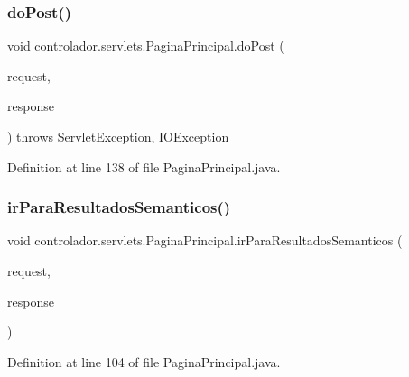 \subsubsection{\texorpdfstring{do\+Post()}{doPost()}}
{\footnotesize\ttfamily void controlador.\+servlets.\+Pagina\+Principal.\+do\+Post (\begin{DoxyParamCaption}\item[{Http\+Servlet\+Request}]{request,  }\item[{Http\+Servlet\+Response}]{response }\end{DoxyParamCaption}) throws Servlet\+Exception, I\+O\+Exception\hspace{0.3cm}{\ttfamily [protected]}}



Definition at line 138 of file Pagina\+Principal.\+java.

\hypertarget{classcontrolador_1_1servlets_1_1PaginaPrincipal_a877a4f05faf8f1932e20cece0f7d39b7}{}\label{classcontrolador_1_1servlets_1_1PaginaPrincipal_a877a4f05faf8f1932e20cece0f7d39b7} 
\subsubsection{\texorpdfstring{ir\+Para\+Resultados\+Semanticos()}{irParaResultadosSemanticos()}}
{\footnotesize\ttfamily void controlador.\+servlets.\+Pagina\+Principal.\+ir\+Para\+Resultados\+Semanticos (\begin{DoxyParamCaption}\item[{Http\+Servlet\+Request}]{request,  }\item[{Http\+Servlet\+Response}]{response }\end{DoxyParamCaption})\hspace{0.3cm}{\ttfamily [private]}}



Definition at line 104 of file Pagina\+Principal.\+java.

\hypertarget{classcontrolador_1_1servlets_1_1PaginaPrincipal_a0aad40bb7b533fd6686c38b99b6aded8}{}\label{classcontrolador_1_1servlets_1_1PaginaPrincipal_a0aad40bb7b533fd6686c38b99b6aded8} 

